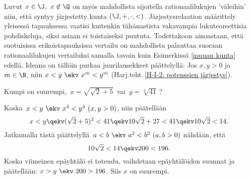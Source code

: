 Luvut $x\in\J,\ x\not\in\Q$ on myös mahdollista sijoitella rationaalilukujen 'väleihin' niin,
että syntyy järjestetty kunta $(\J,+,\cdot,<)$. Järjestysrelaation määrittely yleisessä
tapauksessa vaatisi kuitenkin tähänastista vakavampia lukuteoreettisia pohdiskeluja, siksi
asiaan ei toistaiseksi puututa. Todettakoon ainoastaan, että suotuisissa erikoistapauksissa
vertailu on mahdollista palauttaa suoraan rationaalilukujen vertailuksi samalla tavoin kuin
Esimerkissä \ref{muuan kunta} edellä. Ideana on tällöin purkaa juurilausekkeet päättelyllä: Jos
$x,y>0$ ja $m\in\N$, niin $x<y\ \ekv\ x^m<y^m$ (Harj.teht.\,\ref{H-I-2: potenssien järjestys}).
\begin{Exa} Kumpi on suurempi, $\,x=\sqrt{\sqrt{2}+5}\,$ vai $\,y=\sqrt[4]{41}$\,? \end{Exa}
\ratk Koska $\,x<y\ \ekv\ x^4<y^4\ (x,y>0)$, niin päätellään
\[
x<y \qekv (\sqrt{2}+5)^2 < 41 \qekv 10\sqrt{2}+27 < 41 \qekv 10\sqrt{2} < 14.
\]
Jatkamalla tästä päättelyllä $\,a<b\ \ekv\ a^2<b^2\ (a,b>0)$ nähdään, että
\[
10\sqrt{2} < 14 \qekv 200 < 196.
\]
Koska viimeinen epäyhtälö ei toteudu, vaihdetaan epäyhtälöiden suunnat ja päätellään:
$x>y\ \ekv\ 200>196$. Siis $x$ on suurempi. \loppu

